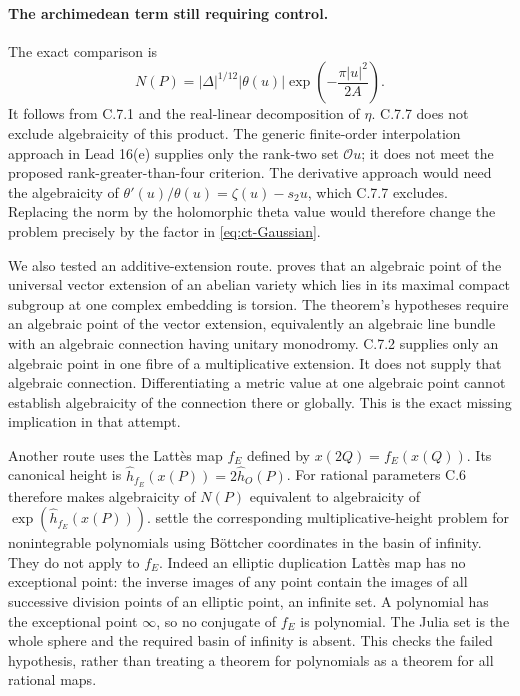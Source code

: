 \paragraph{The archimedean term still requiring control.}
The exact comparison is
\begin{equation}\label{eq:ct-Gaussian}
 N(P)=|\Delta|^{1/12}|\theta(u)|
                         \exp\left(-\frac{\pi|u|^2}{2A}\right).
\end{equation}
It follows from C.7.1 and the real-linear decomposition of
$\eta$. C.7.7 does not exclude algebraicity of this product.
The generic finite-order interpolation approach in Lead 16(e)
supplies only the rank-two set $\mathcal O u$; it does not
meet the proposed rank-greater-than-four criterion. The
derivative approach would need the algebraicity of
$\theta'(u)/\theta(u)=\zeta(u)-s_2u$, which C.7.7 excludes.
Replacing the norm by the holomorphic theta value would
therefore change the problem precisely by the factor in
\eqref{eq:ct-Gaussian}.

We also tested an additive-extension route.
\citet[Theorem 3.1.2]{bost2009} proves that an algebraic point
of the universal vector extension of an abelian variety which
lies in its maximal compact subgroup at one complex embedding
is torsion. The theorem's hypotheses require an algebraic
point of the vector extension, equivalently an algebraic line
bundle with an algebraic connection having unitary monodromy.
C.7.2 supplies only an algebraic point in one fibre of a
multiplicative extension. It does not supply that algebraic
connection. Differentiating a metric value at one algebraic
point cannot establish algebraicity of the connection there
or globally. This is the exact missing implication in that
attempt.

Another route uses the Latt\`es map $f_E$ defined by
$x(2Q)=f_E(x(Q))$. Its canonical height is
$\widehat h_{f_E}(x(P))=2\widehat h_O(P)$. For rational
parameters C.6 therefore makes algebraicity of $N(P)$
equivalent to algebraicity of
$\exp(\widehat h_{f_E}(x(P)))$.
\citet[Theorem 1.4 and Corollary 1.6]{nguyen2023} settle the
corresponding multiplicative-height problem for nonintegrable
polynomials using B\"ottcher coordinates in the basin of
infinity. They do not apply to $f_E$. Indeed an elliptic
duplication Latt\`es map has no exceptional point: the inverse
images of any point contain the images of all successive
division points of an elliptic point, an infinite set. A
polynomial has the exceptional point $\infty$, so no conjugate
of $f_E$ is polynomial. The Julia set is the whole sphere
and the required basin of infinity is absent. This checks
the failed hypothesis, rather than treating a theorem for
polynomials as a theorem for all rational maps.

